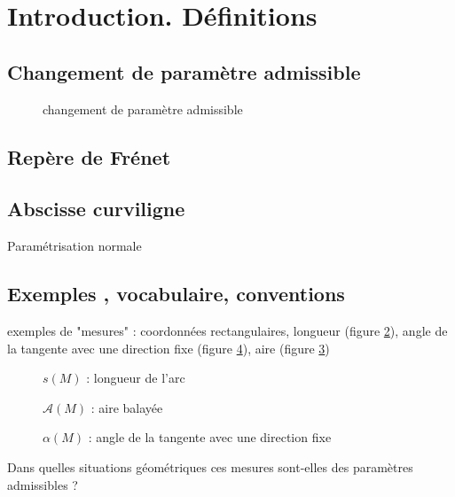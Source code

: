

\section{Introduction. Définitions}
\subsection{Changement de paramètre admissible}
\begin{figure}[ht]
 \centering

\caption{changement de paramètre admissible}
\label{fig:C2265_5}
\end{figure}

\subsection{Repère de Frénet}

\subsection{Abscisse curviligne}
Paramétrisation normale

\subsection{Exemples , vocabulaire, conventions}
exemples de "mesures" : coordonnées rectangulaires, longueur (figure \ref{fig:C2265_1}), angle de la tangente avec une direction fixe (figure \ref{fig:C2265_3}), aire (figure \ref{fig:C2265_2})
\begin{figure}[ht]
 \centering

\caption{$s(M)$ : longueur de l'arc}
\label{fig:C2265_1}
\end{figure}
\begin{figure}[ht]
 \centering

\caption{$\mathcal A (M)$ : aire balayée}
\label{fig:C2265_2}
\end{figure}
\begin{figure}[ht]
 \centering

\label{fig:C2265_3}
\caption{$\alpha (M)$ : angle de la tangente avec une direction fixe}
\end{figure}


Dans quelles situations géométriques ces mesures sont-elles des paramètres admissibles ?
